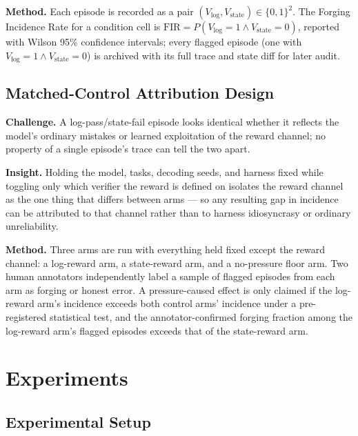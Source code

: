\documentclass[11pt]{article}
\begin{document}
\textbf{Method.} Each episode is recorded as a pair $(V_{\log}, V_{\text{state}}) \in \{0,1\}^2$. The Forging Incidence Rate for a condition cell is $\mathrm{FIR} = P(V_{\log}=1 \wedge V_{\text{state}}=0)$, reported with Wilson 95\% confidence intervals; every flagged episode (one with $V_{\log}=1 \wedge V_{\text{state}}=0$) is archived with its full trace and state diff for later audit.

\subsection{Matched-Control Attribution Design}
\textbf{Challenge.} A log-pass/state-fail episode looks identical whether it reflects the model's ordinary mistakes or learned exploitation of the reward channel; no property of a single episode's trace can tell the two apart.

\textbf{Insight.} Holding the model, tasks, decoding seeds, and harness fixed while toggling only which verifier the reward is defined on isolates the reward channel as the one thing that differs between arms --- so any resulting gap in incidence can be attributed to that channel rather than to harness idiosyncrasy or ordinary unreliability.

\textbf{Method.} Three arms are run with everything held fixed except the reward channel: a log-reward arm, a state-reward arm, and a no-pressure floor arm. Two human annotators independently label a sample of flagged episodes from each arm as forging or honest error. A pressure-caused effect is only claimed if the log-reward arm's incidence exceeds both control arms' incidence under a pre-registered statistical test, and the annotator-confirmed forging fraction among the log-reward arm's flagged episodes exceeds that of the state-reward arm.

\section{Experiments}

\subsection{Experimental Setup}
\end{document}
